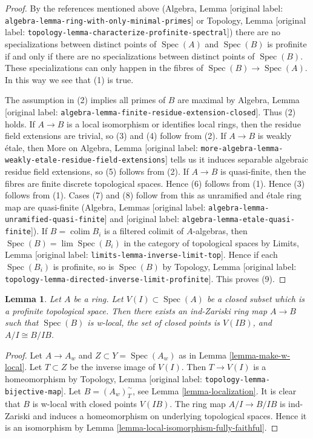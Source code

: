 \documentclass[10pt,a4paper]{article}
\theoremstyle{plain}
\newtheorem{lemma}[subsection]{Lemma}
\theoremstyle{definition}
\theoremstyle{remark}
\numberwithin{equation}{subsection}
\def\lim{\mathop{\mathrm{lim}}\nolimits}
\def\colim{\mathop{\mathrm{colim}}\nolimits}
\def\Spec{\mathop{\mathrm{Spec}}}
\begin{document}
\begin{proof}
By the references mentioned above
(Algebra, Lemma \textnormal{[original label: \nolinkurl{algebra-lemma-ring-with-only-minimal-primes}]} or
Topology, Lemma \textnormal{[original label: \nolinkurl{topology-lemma-characterize-profinite-spectral}]})
there are no specializations between distinct points of $\Spec(A)$ and
$\Spec(B)$ is profinite if and only if there are no specializations
between distinct points of $\Spec(B)$. These specializations can only
happen in the fibres of $\Spec(B) \to \Spec(A)$. In this way we see
that (1) is true.

\medskip\noindent
The assumption in (2) implies all primes of $B$ are maximal by
Algebra, Lemma \textnormal{[original label: \nolinkurl{algebra-lemma-finite-residue-extension-closed}]}.
Thus (2) holds.
If $A \to B$ is a local isomorphism or identifies local rings,
then the residue field extensions are trivial, so (3) and (4)
follow from (2).
If $A \to B$ is weakly \'etale, then More on Algebra, Lemma
\textnormal{[original label: \nolinkurl{more-algebra-lemma-weakly-etale-residue-field-extensions}]}
tells us it induces separable algebraic residue field extensions, so
(5) follows from (2).
If $A \to B$ is quasi-finite, then the fibres are finite discrete
topological spaces. Hence (6) follows from (1).
Hence (3) follows from (1). Cases (7) and (8)
follow from this as unramified and \'etale ring map are quasi-finite
(Algebra, Lemmas
\textnormal{[original label: \nolinkurl{algebra-lemma-unramified-quasi-finite}]} and
\textnormal{[original label: \nolinkurl{algebra-lemma-etale-quasi-finite}]}).
If $B = \colim B_i$ is a filtered colimit of $A$-algebras, then
$\Spec(B) = \lim \Spec(B_i)$ in the category of topological spaces by
Limits, Lemma \textnormal{[original label: \nolinkurl{limits-lemma-inverse-limit-top}]}.
Hence if each $\Spec(B_i)$ is profinite, so is $\Spec(B)$ by
Topology, Lemma \textnormal{[original label: \nolinkurl{topology-lemma-directed-inverse-limit-profinite}]}.
This proves (9).
\end{proof}

\begin{lemma}
\label{lemma-localize-along-closed-profinite}
Let $A$ be a ring. Let $V(I) \subset \Spec(A)$ be a closed subset
which is a profinite topological space. Then there exists an
ind-Zariski ring map $A \to B$ such that $\Spec(B)$ is w-local,
the set of closed points is $V(IB)$, and $A/I \cong B/IB$.
\end{lemma}

\begin{proof}
Let $A \to A_w$ and $Z \subset Y = \Spec(A_w)$ as in
Lemma \ref{lemma-make-w-local}.
Let $T \subset Z$ be the inverse image of $V(I)$.
Then $T \to V(I)$ is a homeomorphism by
Topology, Lemma \textnormal{[original label: \nolinkurl{topology-lemma-bijective-map}]}.
Let $B = (A_w)_T^\sim$, see Lemma \ref{lemma-localization}.
It is clear that $B$ is w-local with closed points $V(IB)$.
The ring map $A/I \to B/IB$ is ind-Zariski
and induces a homeomorphism on underlying
topological spaces. Hence it is an isomorphism by
Lemma \ref{lemma-local-isomorphism-fully-faithful}.
\end{proof}
\end{document}
